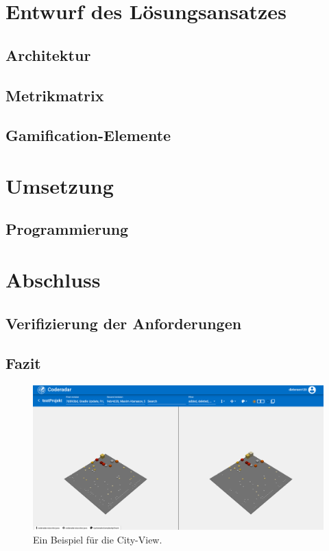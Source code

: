\documentclass[
	oneside,  %
	ngerman, 
	final, 
	11pt, 
	a4paper, 
	1.1headlines, 
	headinclude=false, 
	footinclude=false, 
	mpinclude=false, 
	pagesize, 
	onecolumn, 
	titlepage, 
	parskip=half, 
	headsepline, 
	chapterprefix=false, 
	version=first, 
	listof=totoc, 
	bibliography=totoc, 
	toc=graduated, 
	fleqn
]{scrbook}
\begin{document}
\chapter{Entwurf des Lösungsansatzes}
\label{Entwurf}


\section{Architektur}
\label{Architektur}


\section{Metrikmatrix}
\label{Metrikmatrix}


\section{Gamification-Elemente}
\label{Gamification_Elemente}


\chapter{Umsetzung}
\label{Umsetzung}


\section{Programmierung}
\label{Programmierung}


\chapter{Abschluss}
\label{Abschluss}


\section{Verifizierung der Anforderungen}
\label{Verifizierung_Anforderungen}


\section{Fazit}
\label{Fazit}


\begin{figure}[htb]
	\begin{center}
		\includegraphics[width=\linewidth]{images/city_view}
		\caption{Ein Beispiel für die City-View.}
		\label{city_view}
	\end{center}
\end{figure}
\end{document}
